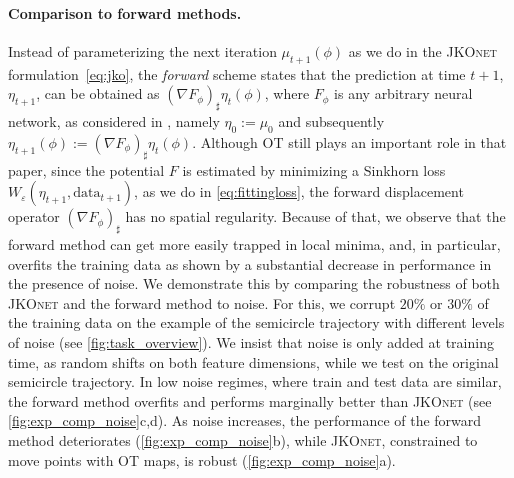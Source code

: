\paragraph{Comparison to forward methods.} \label{sec:eval_comp_fb}
Instead of parameterizing the next iteration $\mu_{t+1}(\phi)$ as we do in the \textsc{JKOnet} formulation~\eqref{eq:jko}, the \emph{forward} scheme states that the prediction at time $t+1$, $\eta_{t+1}$, can be obtained as $(\nabla F_\phi)_{\sharp} \eta_t(\phi)$, where $F_\phi$ is any arbitrary neural network, as considered in \citet{hashimoto2016learning}, namely $\eta_0:=\mu_0$ and subsequently $\eta_{t+1}(\phi):=(\nabla F_\phi)_{\sharp} \eta_t(\phi)$. Although OT still plays an important role in that paper, since the potential $F$ is estimated by minimizing a Sinkhorn loss $W_\varepsilon(\eta_{t+1},\mathrm{data}_{t+1})$, as we do in \eqref{eq:fittingloss}, the forward displacement operator $(\nabla F_\phi)_{\sharp}$ has no spatial regularity. Because of that, we observe that the forward method can get more easily trapped in local minima, and, in particular, overfits the training data as shown by a substantial decrease in performance in the presence of noise.
We demonstrate this by comparing the robustness of both \textsc{JKOnet} and the forward method to noise. For this, we corrupt $20\%$ or $30\%$ of the training data on the example of the semicircle trajectory with different levels of noise (see \cref{fig:task_overview}). We insist that noise is only added at training time, as random shifts on both feature dimensions, while we test on the original semicircle trajectory.
In low noise regimes, where train and test data are similar, the forward method overfits and performs marginally better than \textsc{JKOnet} (see \cref{fig:exp_comp_noise}c,d). As noise increases, the performance of the forward method deteriorates (\cref{fig:exp_comp_noise}b), while \textsc{JKOnet}, constrained to move points with OT maps, is robust (\cref{fig:exp_comp_noise}a).%


